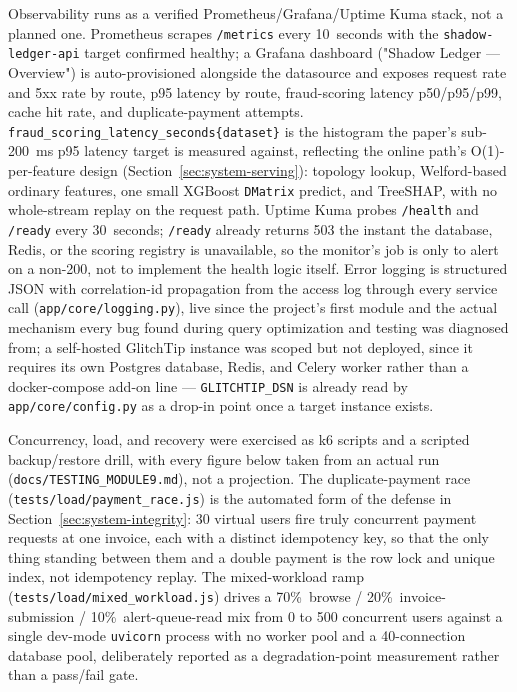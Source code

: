 Observability runs as a verified Prometheus/Grafana/Uptime Kuma stack, not a planned one. Prometheus scrapes \texttt{/metrics} every 10~seconds with the \texttt{shadow-ledger-api} target confirmed healthy; a Grafana dashboard ("Shadow Ledger — Overview") is auto-provisioned alongside the datasource and exposes request rate and 5xx rate by route, p95 latency by route, fraud-scoring latency p50/p95/p99, cache hit rate, and duplicate-payment attempts. \texttt{fraud\_scoring\_latency\_seconds\{dataset\}} is the histogram the paper's sub-200~ms p95 latency target is measured against, reflecting the online path's O(1)-per-feature design (Section~\ref{sec:system-serving}): topology lookup, Welford-based ordinary features, one small XGBoost \texttt{DMatrix} predict, and TreeSHAP, with no whole-stream replay on the request path. Uptime Kuma probes \texttt{/health} and \texttt{/ready} every 30~seconds; \texttt{/ready} already returns 503 the instant the database, Redis, or the scoring registry is unavailable, so the monitor's job is only to alert on a non-200, not to implement the health logic itself. Error logging is structured JSON with correlation-id propagation from the access log through every service call (\texttt{app/core/logging.py}), live since the project's first module and the actual mechanism every bug found during query optimization and testing was diagnosed from; a self-hosted GlitchTip instance was scoped but not deployed, since it requires its own Postgres database, Redis, and Celery worker rather than a docker-compose add-on line — \texttt{GLITCHTIP\_DSN} is already read by \texttt{app/core/config.py} as a drop-in point once a target instance exists.

Concurrency, load, and recovery were exercised as k6 scripts and a scripted backup/restore drill, with every figure below taken from an actual run (\texttt{docs/TESTING\_MODULE9.md}), not a projection. The duplicate-payment race (\texttt{tests/load/payment\_race.js}) is the automated form of the defense in Section~\ref{sec:system-integrity}: 30 virtual users fire truly concurrent payment requests at one invoice, each with a distinct idempotency key, so that the only thing standing between them and a double payment is the row lock and unique index, not idempotency replay. The mixed-workload ramp (\texttt{tests/load/mixed\_workload.js}) drives a 70\%~browse / 20\%~invoice-submission / 10\%~alert-queue-read mix from 0 to 500 concurrent users against a single dev-mode \texttt{uvicorn} process with no worker pool and a 40-connection database pool, deliberately reported as a degradation-point measurement rather than a pass/fail gate.

